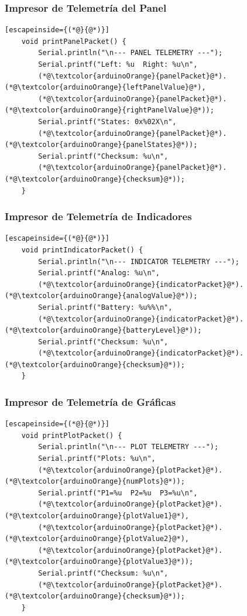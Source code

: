 \documentclass[12pt,a4paper]{article}
\begin{document}
\subsubsection{Impresor de Telemetría del Panel}

\begin{lstlisting}[escapeinside={(*@}{@*)}]
	void printPanelPacket() {
		Serial.println("\n--- PANEL TELEMETRY ---");
		Serial.printf("Left: %u  Right: %u\n",
		(*@\textcolor{arduinoOrange}{panelPacket}@*).(*@\textcolor{arduinoOrange}{leftPanelValue}@*),
		(*@\textcolor{arduinoOrange}{panelPacket}@*).(*@\textcolor{arduinoOrange}{rightPanelValue}@*));
		Serial.printf("States: 0x%02X\n",
		(*@\textcolor{arduinoOrange}{panelPacket}@*).(*@\textcolor{arduinoOrange}{panelStates}@*));
		Serial.printf("Checksum: %u\n",
		(*@\textcolor{arduinoOrange}{panelPacket}@*).(*@\textcolor{arduinoOrange}{checksum}@*));
	}
\end{lstlisting}

\subsubsection{Impresor de Telemetría de Indicadores}

\begin{lstlisting}[escapeinside={(*@}{@*)}]
	void printIndicatorPacket() {
		Serial.println("\n--- INDICATOR TELEMETRY ---");
		Serial.printf("Analog: %u\n",
		(*@\textcolor{arduinoOrange}{indicatorPacket}@*).(*@\textcolor{arduinoOrange}{analogValue}@*));
		Serial.printf("Battery: %u%%\n",
		(*@\textcolor{arduinoOrange}{indicatorPacket}@*).(*@\textcolor{arduinoOrange}{batteryLevel}@*));
		Serial.printf("Checksum: %u\n",
		(*@\textcolor{arduinoOrange}{indicatorPacket}@*).(*@\textcolor{arduinoOrange}{checksum}@*));
	}
\end{lstlisting}

\subsubsection{Impresor de Telemetría de Gráficas}

\begin{lstlisting}[escapeinside={(*@}{@*)}]
	void printPlotPacket() {
		Serial.println("\n--- PLOT TELEMETRY ---");
		Serial.printf("Plots: %u\n",
		(*@\textcolor{arduinoOrange}{plotPacket}@*).(*@\textcolor{arduinoOrange}{numPlots}@*));
		Serial.printf("P1=%u  P2=%u  P3=%u\n",
		(*@\textcolor{arduinoOrange}{plotPacket}@*).(*@\textcolor{arduinoOrange}{plotValue1}@*),
		(*@\textcolor{arduinoOrange}{plotPacket}@*).(*@\textcolor{arduinoOrange}{plotValue2}@*),
		(*@\textcolor{arduinoOrange}{plotPacket}@*).(*@\textcolor{arduinoOrange}{plotValue3}@*));
		Serial.printf("Checksum: %u\n",
		(*@\textcolor{arduinoOrange}{plotPacket}@*).(*@\textcolor{arduinoOrange}{checksum}@*));
	}
\end{lstlisting}
\end{document}
